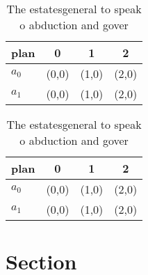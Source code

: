 \documentclass[a4paper]{article}
\begin{document}
\begin{table}
\begin{adjustbox}{width=0.6\columnwidth}
\begin{tabular}{|l|l|l|l|}
\hline
\textbf{plan} & \multicolumn{1}{c|}{\textbf{0}} & \multicolumn{1}{c|}{\textbf{1}} & \multicolumn{1}{c|}{\textbf{2}} \\ \hline
\textbf{$a_0$}  & (0,0) & (1,0) & (2,0) \\ \hline
\textbf{$a_1$}  & (0,0) & (1,0) & (2,0) \\ \hline
\end{tabular}
\end{adjustbox}
\caption{The estatesgeneral to speak o abduction and gover
}
\end{table}

\begin{table}
\begin{adjustbox}{width=0.6\columnwidth}
\begin{tabular}{|l|l|l|l|}
\hline
\textbf{plan} & \multicolumn{1}{c|}{\textbf{0}} & \multicolumn{1}{c|}{\textbf{1}} & \multicolumn{1}{c|}{\textbf{2}} \\ \hline
\textbf{$a_0$}  & (0,0) & (1,0) & (2,0) \\ \hline
\textbf{$a_1$}  & (0,0) & (1,0) & (2,0) \\ \hline
\end{tabular}
\end{adjustbox}
\caption{The estatesgeneral to speak o abduction and gover
}
\end{table}

\section{Section}
\end{document}
